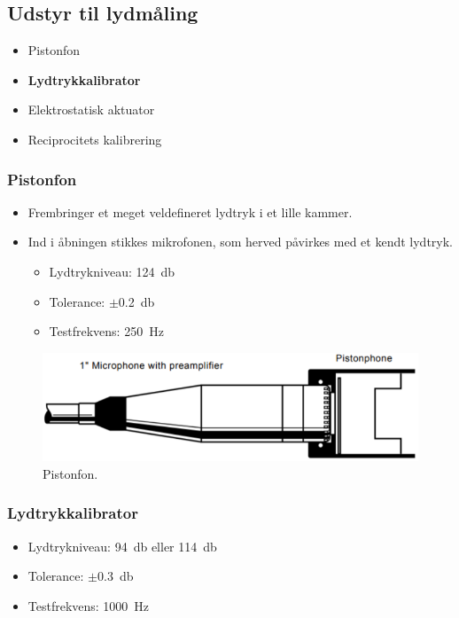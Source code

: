 \subsection{Udstyr til lydmåling}
\begin{itemize}
	\item Pistonfon
	\item \textbf{Lydtrykkalibrator}
	\item Elektrostatisk aktuator
	\item Reciprocitets kalibrering
\end{itemize}

\subsubsection{Pistonfon}
\begin{itemize}
	\item Frembringer et meget veldefineret lydtryk i et lille kammer.
	\item Ind i åbningen stikkes mikrofonen, som herved påvirkes med et kendt lydtryk.
	\begin{itemize}
		\item Lydtrykniveau: \SI{124}{\decibel}
		\item Tolerance: $\pm$\SI{0.2}{\decibel}
		\item Testfrekvens: \SI{250}{\hertz}
	\end{itemize}
\end{itemize}

\begin{figure} [H]
	\centering
	\includegraphics[width=\linewidth]{graphics/2.png}
	\caption{Pistonfon.}
	\label{fig:2}
\end{figure}

\subsubsection{Lydtrykkalibrator}
\begin{itemize}
	\item Lydtrykniveau: \SI{94}{\decibel} eller \SI{114}{\decibel}
	\item Tolerance: $\pm$\SI{0.3}{\decibel}
	\item Testfrekvens: \SI{1000}{\hertz}
\end{itemize}

